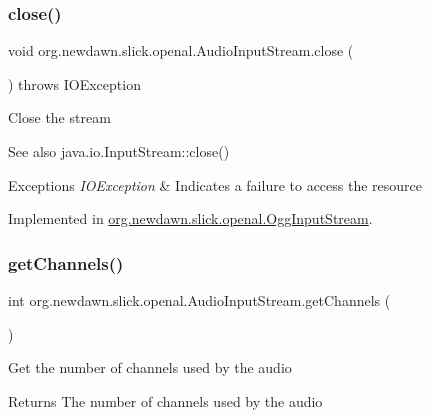 \subsubsection{\texorpdfstring{close()}{close()}}
{\footnotesize\ttfamily void org.\+newdawn.\+slick.\+openal.\+Audio\+Input\+Stream.\+close (\begin{DoxyParamCaption}{ }\end{DoxyParamCaption}) throws I\+O\+Exception}

Close the stream

\begin{DoxySeeAlso}{See also}
java.\+io.\+Input\+Stream\+::close() 
\end{DoxySeeAlso}

\begin{DoxyExceptions}{Exceptions}
{\em I\+O\+Exception} & Indicates a failure to access the resource \\
\hline
\end{DoxyExceptions}


Implemented in \mbox{\hyperlink{classorg_1_1newdawn_1_1slick_1_1openal_1_1_ogg_input_stream_a7b9b6debc212b7f5bb2fdc6a94516fd0}{org.\+newdawn.\+slick.\+openal.\+Ogg\+Input\+Stream}}.

\mbox{\label{interfaceorg_1_1newdawn_1_1slick_1_1openal_1_1_audio_input_stream_a2bee5322dd7878c18fa8f16bd52bbdfa}} 
\subsubsection{\texorpdfstring{get\+Channels()}{getChannels()}}
{\footnotesize\ttfamily int org.\+newdawn.\+slick.\+openal.\+Audio\+Input\+Stream.\+get\+Channels (\begin{DoxyParamCaption}{ }\end{DoxyParamCaption})}

Get the number of channels used by the audio

\begin{DoxyReturn}{Returns}
The number of channels used by the audio 
\end{DoxyReturn}


